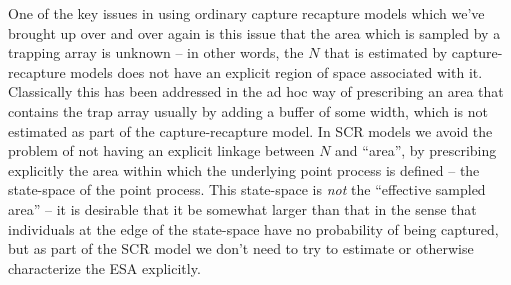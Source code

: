 {One of the key issues in using ordinary capture recapture models which
we've brought up over and over again is this issue that the area which
is sampled by a trapping array is unknown -- in other words, the $N$
that is estimated by capture-recapture models does not have an
explicit region of space associated with it.  Classically this has
been addressed in the ad hoc way of prescribing an area that contains
the trap array usually by adding a buffer of some width, which is not
estimated as part of the capture-recapture model.  In SCR models we
avoid the problem of not having an explicit linkage between $N$ and
``area'', by prescribing explicitly the area within which the
underlying point process is defined -- the state-space of the point
process.  This state-space is {\it not} the ``effective sampled area''
-- it is desirable that it be somewhat larger than that in the sense
that individuals at the edge of the state-space have no probability of
being captured, but as part of the SCR model we don't need to try to
estimate or otherwise characterize the ESA explicitly.

}
